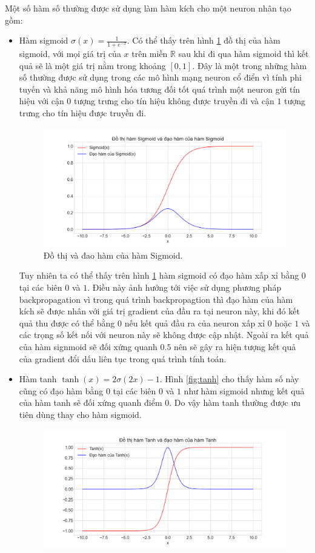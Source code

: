 Một số hàm số thường được sử dụng làm hàm kích cho một neuron nhân tạo gồm:
\begin{itemize}
	\item Hàm sigmoid $\sigma(x) = \frac{1}{1+e^{-x}}$. Có thể thấy trên hình \ref{fig:sigmoid} đồ thị của hàm sigmoid, với mọi giá trị của $x$ trên miền $\mathbb{R}$ sau khi đi qua hàm sigmoid thì kết quả sẽ là một giá trị nằm trong khoảng $[0,1]$. Đây là một trong những hàm số thường được sử dụng trong các mô hình mạng neuron cổ điển vì tính phi tuyến và khả năng mô hình hóa tương đối tốt quá trình một neuron gửi tín hiệu với cận $0$ tượng trưng cho tín hiệu không được truyền đi và cận $1$ tượng trưng cho tín hiệu được truyền đi.
	\begin{figure}[ht!]
		\centerline{\includegraphics[scale=0.4]{images/sigmoid.png}}
  		\caption{Đồ thị và đao hàm của hàm Sigmoid.}
  		\label{fig:sigmoid}
	\end{figure}
	Tuy nhiên ta có thể thấy trên hình \ref{fig:sigmoid} hàm sigmoid có đạo hàm xấp xỉ bằng $0$ tại các biên $0$ và $1$. Điều này ảnh hưởng tới việc sử dụng phương pháp backpropagation vì trong quá trình backpropagtion thì đạo hàm của hàm kích sẽ được nhân với giá trị gradient của đầu ra tại neuron này, khi đó kết quả thu được có thể bằng $0$ nếu kết quả đầu ra của neuron xấp xỉ $0$ hoặc $1$ và các trọng số kết nối với neuron này sẽ không được cập nhật. Ngoài ra kết quả của hàm signmoid sẽ đối xứng quanh $0.5$ nên sẽ gây ra hiện tượng kết quả của gradient đổi dấu liên tục trong quá trình tính toán.
	\item Hàm tanh $\tanh(x)=2\sigma(2x)-1$. Hình \ref{fig:tanh} cho thấy hàm số này cũng có đạo hàm bằng $0$ tại các biên $0$ và $1$ như hàm sigmoid nhưng kết quả của hàm tanh sẽ đối xứng quanh điểm $0$. Do vậy hàm tanh thường được ưu tiên dùng thay cho hàm sigmoid.
	\begin{figure}[ht!]
		\centerline{\includegraphics[scale=0.4]{images/tanh.png}}

\end{figure}
\end{itemize}

